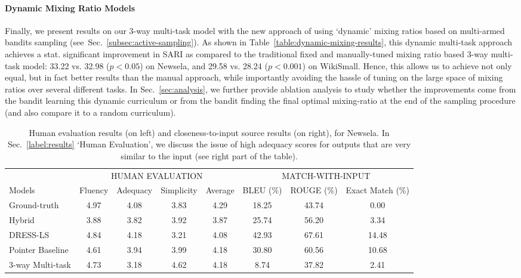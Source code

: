 \documentclass[11pt]{article}
\def\secref#1{Sec.~\ref{#1}}
\begin{document}
\paragraph{Dynamic Mixing Ratio Models}
Finally, we present results on our 3-way multi-task model with the new approach of using `dynamic' mixing ratios based on multi-armed bandits sampling (see~\secref{subsec:active-sampling}). As shown in Table~\ref{table:dynamic-mixing-results}, this dynamic multi-task approach achieves a stat. significant improvement in SARI  as compared to the traditional fixed and manually-tuned mixing ratio based 3-way multi-task model: 33.22 vs. 32.98 ($p<0.05$) on Newsela, and 29.58 vs. 28.24 ($p<0.001$) on WikiSmall. Hence, this allows us to achieve not only equal, but in fact better results than the manual approach, while importantly avoiding the hassle of tuning on the large space of mixing ratios over several different tasks. In Sec.~\ref{sec:analysis}, we further provide ablation analysis to study whether the improvements come from the bandit learning this dynamic curriculum or from the bandit finding the final optimal mixing-ratio at the end of the sampling procedure (and also compare it to a random curriculum).

\begin{table}[t]
\begin{center}
\begin{small}
\begin{tabular}{|l|c|c|c|c|||c|c|c|}
\hline
 & \multicolumn{4}{c|||}{HUMAN EVALUATION} & \multicolumn{3}{c|}{MATCH-WITH-INPUT} \\
Models & Fluency & Adequacy & Simplicity & Average & BLEU (\%) & ROUGE (\%) & Exact Match (\%) \\
\hline
Ground-truth & 4.97 & 4.08 & 3.83 & 4.29 & 18.25 & 43.74 & 0.00 \\
\hdashline
Hybrid & 3.88 & 3.82 & 3.92 & 3.87 & 25.74 & 56.20 & 3.34 \\
DRESS-LS & 4.84 & 4.18 & 3.21 & 4.08 & 42.93 & 67.61 & 14.48 \\
Pointer Baseline & 4.61 & 3.94 & 3.99 & 4.18 & 30.80 & 60.56 & 10.68 \\
3-way Multi-task &  4.73 & 3.18 & 4.62 & 4.18 & 8.74 & 37.82 & 2.41 \\
\hline
\end{tabular}
\end{small}
\end{center}
\vspace{-10pt}
\caption{Human evaluation results (on left) and closeness-to-input source results (on right), for Newsela. In Sec.~\ref{label:results} `Human Evaluation', we discuss the issue of high adequacy scores for outputs that are very similar to the input (see right part of the table).
}
\vspace{-7pt}
\label{table:newsela-human-eval}
\end{table}
\end{document}
